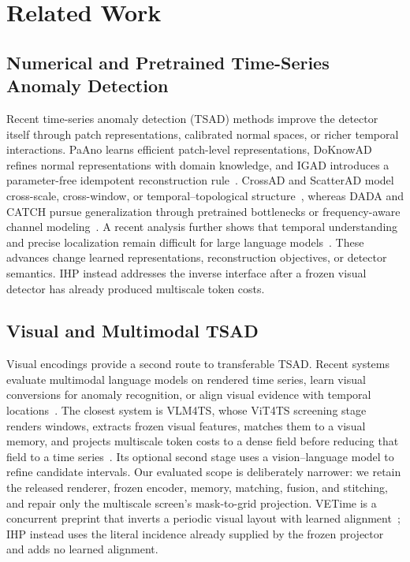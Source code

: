 \section{Related Work}

\subsection{Numerical and Pretrained Time-Series Anomaly Detection}
Recent time-series anomaly detection (TSAD) methods improve the detector itself
through patch representations, calibrated normal spaces, or richer temporal
interactions.  PaAno learns efficient patch-level representations, DoKnowAD
refines normal representations with domain knowledge, and IGAD introduces a
parameter-free idempotent reconstruction rule~\cite{park2026paano,xing2026doknowad,sun2025igad}.
CrossAD and ScatterAD model cross-scale, cross-window, or temporal--topological
structure~\cite{li2025crossad,yin2025scatterad}, whereas DADA and CATCH pursue
generalization through pretrained bottlenecks or frequency-aware channel
modeling~\cite{shentu2025dada,wu2025catch}.  A recent analysis further shows
that temporal understanding and precise localization remain difficult for
large language models~\cite{park2025llmtsad}.  These advances change learned
representations, reconstruction objectives, or detector semantics.  IHP
instead addresses the inverse interface after a frozen visual detector has
already produced multiscale token costs.

\subsection{Visual and Multimodal TSAD}
Visual encodings provide a second route to transferable TSAD.  Recent systems
evaluate multimodal language models on rendered time series, learn visual
conversions for anomaly recognition, or align visual evidence with temporal
locations~\cite{xu2026visualtimeanomaly,wang2026vits,yang2026vetime}.  The
closest system is VLM4TS, whose ViT4TS screening stage renders windows, extracts
frozen visual features, matches them to a visual memory, and projects
multiscale token costs to a dense field before reducing that field to a time
series~\cite{he2026vlm4ts}.  Its optional second stage uses a vision--language
model to refine candidate intervals.  Our evaluated scope is deliberately
narrower: we retain the released renderer, frozen encoder, memory, matching,
fusion, and stitching, and repair only the multiscale screen's mask-to-grid
projection.  VETime is a concurrent preprint that inverts a periodic visual
layout with learned alignment~\cite{yang2026vetime}; IHP instead uses the
literal incidence already supplied by the frozen projector and adds no learned
alignment.

